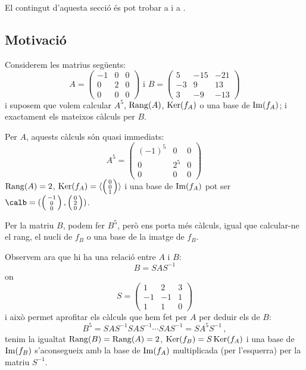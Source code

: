 El contingut d'aquesta secció és pot trobar a \cite[Temes 6, 7]{Bret} i a \cite[Tema 4]{NaXa}.
\subsection{Motivació}\label{subsec:motiv_diag}
Considerem les matrius següents:
$$
A=\begin{pmatrix}
-1 & 0 & 0 \\ 0 & 2 & 0 \\ 0 & 0 & 0
\end{pmatrix}
\text{ i }
B=\begin{pmatrix}
5 & -15 & -21 \\ -3 & 9 & 13 \\ 3 & -9 & -13
\end{pmatrix}
$$
i suposem que volem calcular $A^5$, $\operatorname{Rang}(A)$, $\operatorname{Ker}(f_A)$ o una base de $\operatorname{Im}(f_A)$; i exactament els mateixos càlculs per $B$.

Per $A$, aquests càlculs són quasi immediats:
$$
A^5=\begin{pmatrix}
(-1)^5 & 0 & 0 \\ 0 & 2^5 & 0 \\ 0 & 0 & 0
\end{pmatrix} \,
$$
$\operatorname{Rang}(A)=2$, 
$\operatorname{Ker}(f_A)=\langle \left( \begin{smallmatrix} 0 \\ 0 \\ 1 \end{smallmatrix} \right) \rangle$ i  una base de $\operatorname{Im}(f_A)$ pot ser $\calb=( \left( \begin{smallmatrix} -1 \\ 0 \\ 0 \end{smallmatrix} \right) , \left( \begin{smallmatrix} 0 \\ 2 \\ 0 \end{smallmatrix} \right))$.

Per la matriu $B$, podem fer $B^5$, però ens porta més càlculs, igual que calcular-ne el rang, el nucli de $f_B$ o una base de la imatge de $f_B$.

Observem ara que hi ha una relació entre $A$ i $B$:
$$
B=S A S^{-1}
$$
on 
$$
S=\begin{pmatrix} 1 & 2 & 3 \\ -1 & -1 & 1 \\ 1 & 1 & 0
\end{pmatrix}
$$
i això permet aprofitar els càlculs que hem fet per $A$ per deduir els de $B$:
$$
B^5=S A S^{-1} S A S^{-1} \cdots S A S^{-1}=S A^5 S^{-1} \, ,
$$
tenim la igualtat $\operatorname{Rang}(B)=\operatorname{Rang}(A)=2$, $\operatorname{Ker}(f_B)=S\operatorname{Ker}(f_A)$ i una base de $\operatorname{Im}(f_B)$ s'aconsegueix amb la base de $\operatorname{Im}(f_A)$ multiplicada (per l'esquerra) per la matriu $S^{-1}$.

